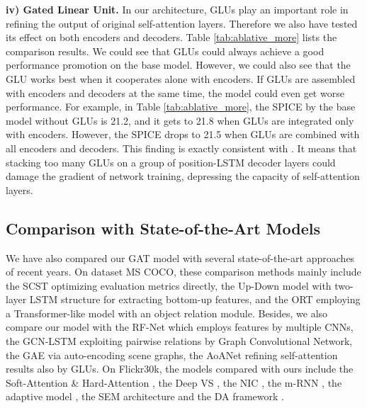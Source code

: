 \documentclass[review]{elsarticle}
\begin{document}
\textbf{iv) Gated Linear Unit.}
In our architecture, GLUs play an important role in refining the output of original self-attention layers. Therefore we also have tested its effect on both encoders and decoders. Table \ref{tab:ablative_more} lists the comparison results. We could see that GLUs could always achieve a good performance promotion on the base model. However, we could also see that the GLU works best when it cooperates alone with encoders. If GLUs are assembled with encoders and decoders at the same time, the model could even get worse performance. For example, in Table \ref{tab:ablative_more}, the SPICE by the base model without GLUs is 21.2, and it gets to 21.8 when GLUs are integrated only with encoders. However, the SPICE drops to 21.5 when GLUs are combined with all encoders and decoders. This finding is exactly consistent with \cite{huang2019attention}. It means that stacking too many GLUs on a group of position-LSTM decoder layers could damage the gradient of network training, depressing the capacity of self-attention layers.

\subsection{Comparison with State-of-the-Art Models}
We have also compared our GAT model with several state-of-the-art approaches of recent years. On dataset MS COCO, these comparison methods mainly include the SCST \cite{rennie2017self} optimizing evaluation metrics directly, the Up-Down model \cite{Anderson_2018_CVPR} with two-layer LSTM structure for extracting bottom-up features, and the ORT \cite{herdade2019image} employing a Transformer-like model with an object relation module. Besides, we also compare our model with the RF-Net \cite{jiang2018recurrent} which employs features by multiple CNNs, the GCN-LSTM \cite{yao2018exploring} exploiting pairwise relations by Graph Convolutional Network, the GAE \cite{yang2019auto} via auto-encoding scene graphs, the AoANet \cite{huang2019attention} refining self-attention results also by GLUs. On Flickr30k, the models compared with ours include the Soft-Attention \& Hard-Attention \cite{xu2015show}, the Deep VS \cite{karpathy2015deep}, the NIC \cite{vinyals2015show}, the m-RNN \cite{mao2014deep}, the adaptive model \cite{Lu_2017_CVPR}, the SEM architecture \cite{CAI202031} and the DA framework \cite{gao2019deliberate}.
\end{document}
